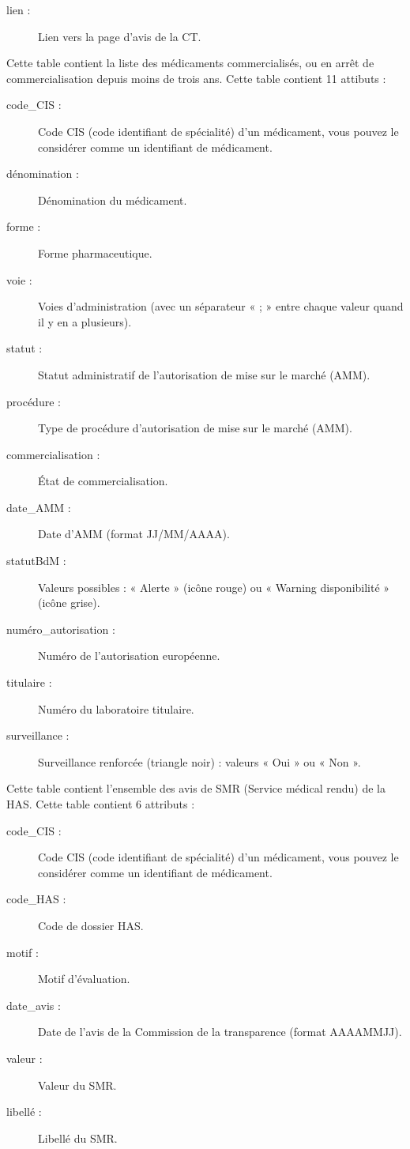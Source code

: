 \begin{description}
\begin{description}
      \item[lien :] Lien vers la page d'avis de la CT.
    \end{description}
  \item[CIS\_bdpm :] Cette table contient la liste des médicaments commercialisés, ou en arrêt de commercialisation depuis moins de trois ans. Cette table contient 11 attibuts : 
    \begin{description}
      \item[code\_CIS :] Code CIS (code identifiant de spécialité) d'un médicament, vous pouvez le considérer comme un identifiant de médicament. 
      \item[dénomination :] Dénomination du médicament. 
      \item[forme :] Forme pharmaceutique.
      \item[voie :] Voies d'administration (avec un séparateur « ; » entre chaque valeur quand il y en a plusieurs). 
      \item[statut :]  Statut administratif de l’autorisation de mise sur le marché (AMM).
      \item[procédure :] Type de procédure d'autorisation de mise sur le marché (AMM).
      \item[commercialisation :] État de commercialisation.
      \item[date\_AMM :] Date d’AMM (format JJ/MM/AAAA).
      \item[statutBdM :] Valeurs possibles : « Alerte » (icône rouge) ou « Warning disponibilité » (icône grise).
      \item[numéro\_autorisation :]  Numéro de l’autorisation européenne.
      \item[titulaire :] Numéro du laboratoire titulaire. 
      \item[surveillance :] Surveillance renforcée (triangle noir) : valeurs « Oui » ou « Non ».
    \end{description}
  \item[CIS\_HAS\_SMR :] Cette table contient l'ensemble des avis de SMR (Service médical rendu) de la HAS. Cette table contient 6 attributs : 
    \begin{description}
      \item[code\_CIS :] Code CIS (code identifiant de spécialité) d'un médicament, vous pouvez le considérer comme un identifiant de médicament. 
      \item[code\_HAS :] Code de dossier HAS. 
      \item[motif :] Motif d'évaluation.
      \item[date\_avis :] Date de l’avis de la Commission de la transparence (format AAAAMMJJ).
      \item[valeur :] Valeur du SMR. 
      \item[libellé :] Libellé du SMR. 
    \end{description}
\end{description}

